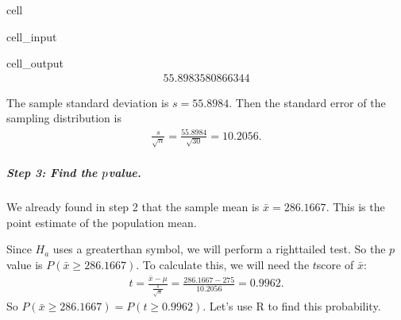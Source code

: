 \documentclass[letterpaper,10pt,english]{jupyterBook}
\begin{document}
\begin{sphinxuseclass}{cell}\begin{sphinxVerbatimInput}

\begin{sphinxuseclass}{cell_input}
\begin{sphinxVerbatim}[commandchars=\\\{\}]
\end{sphinxVerbatim}

\end{sphinxuseclass}\end{sphinxVerbatimInput}
\begin{sphinxVerbatimOutput}

\begin{sphinxuseclass}{cell_output}\begin{equation*}
\begin{split}55.8983580866344\end{split}
\end{equation*}
\end{sphinxuseclass}\end{sphinxVerbatimOutput}

\end{sphinxuseclass}
\sphinxAtStartPar
The sample standard deviation is \(s = 55.8984\). Then the standard error of the sampling distribution is
\begin{equation*}
\begin{split} \frac{s}{\sqrt{n}} = \frac{55.8984}{\sqrt{30}} = 10.2056. \end{split}
\end{equation*}

\subparagraph{Step 3: Find the  \protect\(p\protect\)\sphinxhyphen{}value.}
\label{\detokenize{Ch6 An Introduction to Hypothesis Testing/6.4 Hypothesis Tests of One Population:id7}}
\sphinxAtStartPar
We already found in step 2 that the sample mean is \(\bar{x} = 286.1667\). This is the point estimate of the population mean.

\sphinxAtStartPar
Since \(H_a\) uses a greater\sphinxhyphen{}than symbol, we will perform a right\sphinxhyphen{}tailed test. So the \(p\)\sphinxhyphen{}value is \(P(\bar{x} \geq 286.1667)\). To calculate this, we will need the \(t\)\sphinxhyphen{}score of \(\bar{x}\):
\begin{equation*}
\begin{split}t = \frac{\bar{x} - \mu}{\frac{s}{\sqrt{n}}} = \frac{286.1667 - 275}{10.2056} = 0.9962. \end{split}
\end{equation*}
\sphinxAtStartPar
So \(P(\bar{x} \geq 286.1667) = P(t \geq 0.9962)\). Let’s use R to find this probability.
\end{document}
